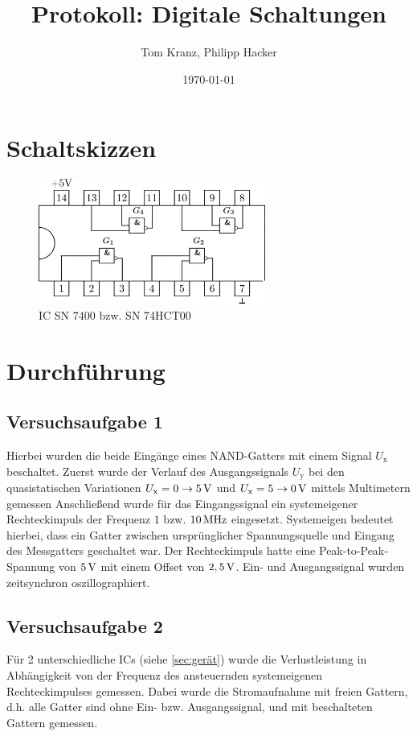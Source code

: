 \documentclass[numbers=noenddot,12pt,a4paper]{scrartcl}
\title{Protokoll: Digitale Schaltungen}
\author{Tom Kranz, Philipp Hacker}
\date{\today}
\newcommand{\ix}[1]{_\text{#1}}
\begin{document}
\maketitle
\vspace*{\fill}
\tableofcontents
\vfill
\newpage
\section{Schaltskizzen}
\begin{figure}[H]
\centering
\includegraphics[width=0.666\textwidth]{NANDIC.png}
\caption{IC SN 7400 bzw. SN 74HCT00} \label{img:ic}
\end{figure}
\section{Durchführung}
\subsection{Versuchsaufgabe 1}
Hierbei wurden die beide Eingänge eines NAND-Gatters mit einem Signal $U\ix{x}$ beschaltet. Zuerst wurde der Verlauf des Ausgangssignals $U\ix{y}$ bei den quasistatischen Variationen $U\ix{x}=0\rightarrow\unit[5]{V}$ und $U\ix{x}=5\rightarrow\unit[0]{V}$ mittels Multimetern gemessen Anschließend wurde für das Eingangssignal ein systemeigener Rechteckimpuls der Frequenz $1$ bzw. $\unit[10]{MHz}$ eingesetzt. Systemeigen bedeutet hierbei, dass ein Gatter zwischen ursprünglicher Spannungsquelle und Eingang des Messgatters geschaltet war. Der Rechteckimpuls hatte eine Peak-to-Peak-Spannung von $\unit[5]{V}$ mit einem Offset von $\unit[2,5]{V}$. Ein- und Ausgangssignal wurden zeitsynchron oszillographiert.
\subsection{Versuchsaufgabe 2}
Für 2 unterschiedliche ICs (siehe \ref{sec:gerät}) wurde die Verlustleistung in Abhängigkeit von der Frequenz des ansteuernden systemeigenen Rechteckimpulses gemessen. Dabei wurde die Stromaufnahme mit freien Gattern, d.h. alle Gatter sind ohne Ein- bzw. Ausgangssignal, und mit beschalteten Gattern gemessen.
\end{document}
